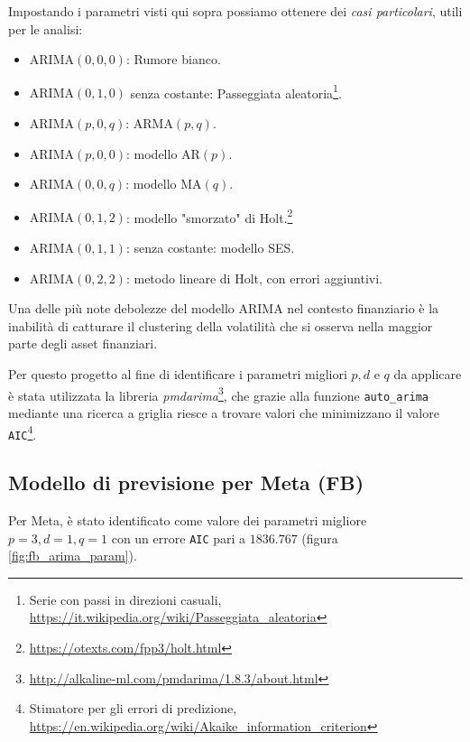 Impostando i parametri visti qui sopra possiamo ottenere dei \emph{casi particolari}, utili per le analisi:

\begin{itemize}
    \item \(\text{ARIMA} (0,0,0)\): Rumore bianco.
    \item \(\text{ARIMA} (0,1,0)\) senza costante: Passeggiata 
    aleatoria\footnote{
        Serie con passi in direzioni casuali, \href{https://it.wikipedia.org/wiki/Passeggiata_aleatoria}{https://it.wikipedia.org/wiki/Passeggiata\_aleatoria}
    }.
    \item \(\text{ARIMA} (p,0,q)\): \(\text{ARMA} (p,q)\).
    \item \(\text{ARIMA} (p,0,0)\): modello \(\text{AR} (p)\).
    \item \(\text{ARIMA} (0,0,q)\): modello \(\text{MA} (q)\).
    \item \(\text{ARIMA} (0,1,2)\): modello "smorzato" di 
    Holt.\footnote{
        \href{https://otexts.com/fpp3/holt.html}{https://otexts.com/fpp3/holt.html}
    }
    \item \(\text{ARIMA} (0,1,1)\): senza costante: modello SES.
    \item \(\text{ARIMA} (0,2,2)\): metodo lineare di Holt\footnotemark[28], con errori aggiuntivi.
\end{itemize}

Una delle più note debolezze del modello ARIMA nel contesto finanziario è la inabilità di catturare il clustering della volatilità
che si osserva nella maggior parte degli asset finanziari.

Per questo progetto al fine di identificare i parametri migliori \(p, d \text{ e } q \) da applicare è stata utilizzata la libreria 
\emph{pmdarima}\footnote{
    \href{http://alkaline-ml.com/pmdarima/1.8.3/about.html}{http://alkaline-ml.com/pmdarima/1.8.3/about.html}
}, che grazie alla funzione \verb|auto_arima| mediante una ricerca a griglia riesce a trovare valori che minimizzano il valore 
\verb|AIC|\footnote{
    Stimatore per gli errori di predizione, \href{https://en.wikipedia.org/wiki/Akaike_information_criterion}{https://en.wikipedia.org/wiki/Akaike\_information\_criterion}
}.

\subsection{Modello di previsione per Meta (FB)}

Per Meta, è stato identificato come valore dei parametri migliore \(p=3, d=1, q=1\) con un errore \verb|AIC| pari a \(1836.767\) (figura \ref{fig:fb_arima_param}).

